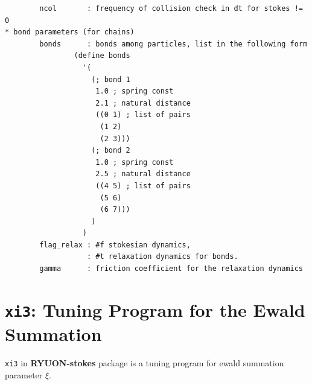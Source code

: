 \documentclass{book}
\begin{document}
{\begin{verbatim}
        ncol       : frequency of collision check in dt for stokes != 0
* bond parameters (for chains)
        bonds      : bonds among particles, list in the following form
                (define bonds
                  '(
                    (; bond 1
                     1.0 ; spring const
                     2.1 ; natural distance
                     ((0 1) ; list of pairs
                      (1 2)
                      (2 3)))
                    (; bond 2
                     1.0 ; spring const
                     2.5 ; natural distance
                     ((4 5) ; list of pairs
                      (5 6)
                      (6 7)))
                    )
                  )
        flag_relax : #f stokesian dynamics,
                   : #t relaxation dynamics for bonds.
        gamma      : friction coefficient for the relaxation dynamics
\end{verbatim}
}

\section{{\tt xi3}:
  Tuning Program for the Ewald Summation}
\label{sec:xi3}
{\tt xi3} in {\bf RYUON-stokes} package
is a tuning program for ewald summation parameter $\xi$.
\end{document}
